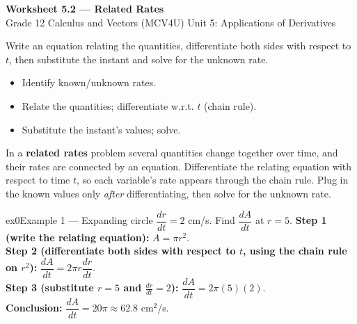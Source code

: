 \documentclass[11pt]{article}
\begin{document}
\begin{center}
{\LARGE\bfseries\color{titleblue}Worksheet 5.2 --- Related Rates}\\[2pt]
{\small Grade 12 Calculus and Vectors (MCV4U) \textperiodcentered{} Unit 5: Applications of Derivatives}
\end{center}

\begin{ideabox}
Write an equation relating the quantities, differentiate both sides with respect to $t$, then substitute the instant and solve for the unknown rate.
\begin{itemize}[leftmargin=*,itemsep=2pt]
  \item Identify known/unknown rates.
  \item Relate the quantities; differentiate w.r.t. $t$ (chain rule).
  \item Substitute the instant's values; solve.
\end{itemize}
\end{ideabox}

\begin{learnbox}
In a \textbf{related rates} problem several quantities change together over time, and their rates are connected by an equation.
Differentiate the relating equation with respect to time $t$, so each variable's rate appears through the chain rule.
Plug in the known values only \emph{after} differentiating, then solve for the unknown rate.
\end{learnbox}


\begin{example}{ex0}{Example 1 --- Expanding circle}
$\dfrac{dr}{dt}=2$ cm/s. Find $\dfrac{dA}{dt}$ at $r=5$.\soln
\textbf{Step 1 (write the relating equation):} $A=\pi r^2$.\\[3pt]
\textbf{Step 2 (differentiate both sides with respect to $t$, using the chain rule on $r^2$):} $\dfrac{dA}{dt}=2\pi r\dfrac{dr}{dt}$.\\[3pt]
\textbf{Step 3 (substitute $r=5$ and $\frac{dr}{dt}=2$):} $\dfrac{dA}{dt}=2\pi(5)(2)$.\\[3pt]
\textbf{Conclusion:} $\dfrac{dA}{dt}=20\pi\approx62.8$ cm$^2$/s.
\end{example}
\end{document}
